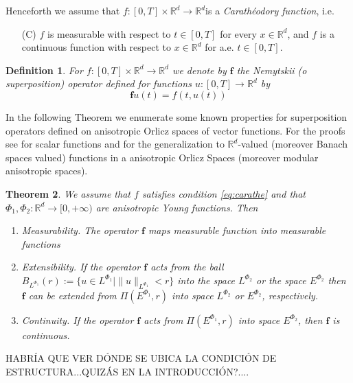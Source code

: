 \documentclass[twoside]{article}
\makeatletter
\newtheorem{thm}{Theorem}[section]
\newtheorem{defi}[thm]{Definition}
\theoremstyle{remark}
\def\namedlabel#1#2{\begingroup
    #2%
    \def\@currentlabel{#2}%
    \phantomsection\label{#1}\endgroup
}
\renewcommand{\b}[1]{\boldsymbol{#1}}
\newcommand{\rr}{\mathbb{R}}
\makeatother
\begin{document}
Henceforth we assume that  $f:[0,T]\times \rr^d\to\rr^d$is a \emph{Carath\'eodory function}, i.e.

\begin{enumerate}
 \item[\namedlabel{eq:carathe}{(C)}] $f$ is measurable with respect to $t\in [0,T]$ for every  $x\in\rr^d$, and $f$ is a continuous function with  respect to  $x\in\rr^d$ for a.e. $t \in [0,T]$.
\end{enumerate}




\begin{defi}
 For $f:[0,T]\times \rr^d\to\rr^d$  we denote by $\b{f}$ the Nemytskii (o superposition) operator defined for functions $u:[0,T]\to\rr^d$ by
\[\b{f}u(t)=f(t,u(t))\]
\end{defi}

In the following Theorem we enumerate  some known properties for superposition operators defined on anisotropic Orlicz spaces of vector functions.   For the proofs see \cite{krasnosel2011integral} for scalar functions  and
\cite{zbMATH04038592,zbMATH03983966,zbMATH03942215} for the generalization to  $\mathbb{R}^d$-valued  (moreover Banach spaces valued)  functions in a anisotropic Orlicz Spaces (moreover modular anisotropic spaces).

\begin{thm} We assume that $f$ satisfies condition \eqref{eq:carathe} and that $\Phi_1,\Phi_2:\rr^d\to [0,+\infty)$ are anisotropic Young functions. Then
\begin{enumerate}
 \item\label{it:measure}\emph{Measurability.}  The operator $\b{f}$ maps  measurable function into measurable functions
 \item\label{it:exten}\emph{Extensibility.}  If the operator $\b{f}$ acts from the ball $B_{L^{\Phi_1}}(r):=\{ u\in L^{\Phi_1}| \|u\|_{L^{\Phi_1}}<r\}$ into the space $L^{\Phi_2}$ or the space $E^{\Phi_2}$ then $\b{f}$ can be extended  from $\Pi(E^{\Phi_1},r)$ into space $L^{\Phi_2}$ or  $E^{\Phi_2}$, respectively.
 \item\label{it:exten}\emph{Continuity.} If the operator $\b{f}$ acts from $\Pi(E^{\Phi_1},r)$ into space $E^{\Phi_2}$, then $\b{f}$ is continuous.
\end{enumerate}
\end{thm}

HABR\'IA QUE VER D\'ONDE SE UBICA LA CONDICI\'ON DE ESTRUCTURA...QUIZ\'AS EN LA INTRODUCCI\'ON?....
\end{document}
